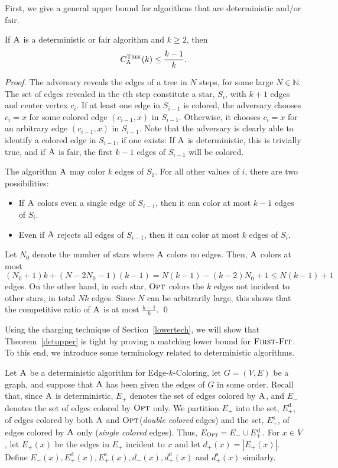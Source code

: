 \documentclass[smallextended]{svjour3}
\def\mck{{\sc Edge-$k$-Coloring}\xspace}
\newcommand{\ec}{\ensuremath{E_{+}}\xspace}
\newcommand{\ed}{\ensuremath{E_{+}^{\text{d}}}\xspace}
\newcommand{\er}{\ensuremath{E_{-}}\xspace}
\newcommand{\es}{\ensuremath{E_{+}^{\text{s}}}\xspace}
\def\dc{d_{+}}
\def\dd{d_{+}^{\text{d}}}
\def\dr{d_{-}}
\def\ds{d_{+}^{\text{s}}}
\newcommand{\FF}{\ensuremath{\operatorname{\textsc{First-Fit}}}\xspace}
\newcommand{\OPT}{\ensuremath{\operatorname{\textsc{Opt}}}\xspace}
\newcommand{\ALG}{\ensuremath{\operatorname{\textsc{A}}}\xspace}
\newcommand{\ab}[1] {\left\vert #1\right\vert}
\begin{document}
First, we give a general upper bound for algorithms that are deterministic and/or fair.

\begin{theorem}
\label{detupper}
If $\ALG$ is a deterministic or fair algorithm and $k\geq 2$, then 
\begin{displaymath}
C_{\ALG}^{\text{\sc Tree}}(k)\leq\frac{k-1}{k}.
\end{displaymath}
\end{theorem}
\begin{proof}
The adversary reveals the edges of a tree in $N$ steps, for some large $N \in \mathbb{N}$. The set of edges revealed in the $i$th step constitute a star, $S_i$, with $k+1$ edges and center vertex $c_i$. If at least one edge in $S_{i-1}$ is colored, the adversary chooses $c_i = x$ for some colored edge $(c_{i-1},x)$ in $S_{i-1}$. Otherwise, it chooses $c_i = x$ for an arbitrary edge $(c_{i-1},x)$ in $S_{i-1}$. Note that the adversary is clearly able to identify a colored edge in $S_{i-1}$, if one exists: If \ALG is deterministic, this is trivially true, and if \ALG is fair,  the first $k-1$ edges of $S_{i-1}$ will be colored. 

The algorithm $\ALG$ may color $k$ edges of $S_1$. For all other values of $i$, there are two possibilities:
\begin{itemize}
\item  If $\ALG$ colors even a
single edge of $S_{i-1}$, then it can color at most $k-1$ edges of
$S_i$.
\item Even if $\ALG$ rejects all edges of $S_{i-1}$, then it can color at most $k$ edges of $S_i$. 
\end{itemize}
Let $N_0$ denote the number of stars where \ALG colors no edges.
Then, \ALG colors at most $(N_0+1)k + (N-2N_0-1)(k-1) = N(k-1) - (k-2)N_0 +1 \leq N(k-1)+1$ edges.
On the other hand, in each star, \OPT colors the $k$ edges not incident to other stars, in total $Nk$ edges. Since $N$ can be arbitrarily large, this shows that the competitive ratio of $\ALG$ is at most $\frac{k-1}{k}$.
\qed\end{proof}

Using the charging technique of Section~\ref{lowertech}, we will show that
 Theorem~\ref{detupper} is tight by proving a matching lower bound for \FF.
To this end, we introduce some terminology related to deterministic
 algorithms.

Let $\ALG$ be a deterministic algorithm for \mck, let $G=(V,E)$ be
 a graph, and suppose that $\ALG$ has been given the edges of $G$ in
 some order.
Recall that, since \ALG is deterministic, $E_+$ denotes the set of
 edges colored by \ALG, and $E_-$ denotes the set of edges
 colored by \OPT only.
We partition $E_+$ into the set, \ed, of edges colored by both \ALG
 and \OPT ({\em double colored} edges) and the set, \es, of edges 
 colored by \ALG only ({\em single colored} edges).
Thus, $E_{\OPT}=\er\cup\ed$. 
For $x\in V$, let $\ec(x)$ be the edges in $\ec$ incident to 
$x$ and let $\dc(x)=\ab{\ec(x)}$. Define $\er(x), \ed(x), \es(x), \dr(x), \dd(x)$ and $\ds(x)$ similarly.
\end{document}
